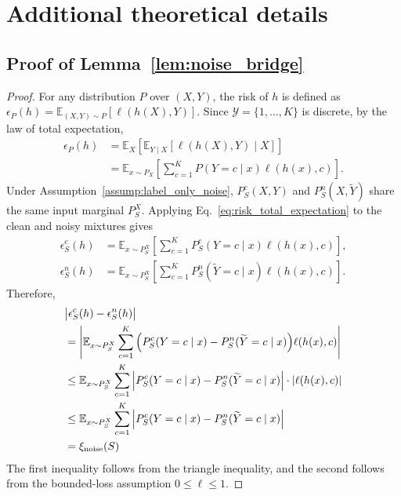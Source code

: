 \documentclass[conference]{IEEEtran}
\theoremstyle{definition}
\theoremstyle{remark}
\begin{document}
\section{Additional theoretical details}
\label{app:theory_appendix}
\subsection{Proof of Lemma~\ref{lem:noise_bridge}}
\begin{proof}
For any distribution $P$ over $(X,Y)$, the risk of $h$ is defined as
$\epsilon_P(h)=\mathbb E_{(X,Y)\sim P}[\ell(h(X),Y)]$.
Since $\mathcal Y=\{1,\dots,K\}$ is discrete, by the law of total expectation,
\begin{align}
\epsilon_P(h)
&=
\mathbb E_{X}
\left[
\mathbb E_{Y\mid X}
\left[
\ell(h(X),Y)
\mid X
\right]
\right] \\
&=
\mathbb E_{x\sim P_X}
\left[
\sum_{c=1}^{K}
P(Y=c\mid x)\ell(h(x),c)
\right].
\label{eq:risk_total_expectation}
\end{align}
Under Assumption~\ref{assump:label_only_noise}, $P_S^c(X,Y)$ and $P_S^n(X,\widetilde Y)$ share the same input marginal $P_S^X$.
Applying Eq.~\eqref{eq:risk_total_expectation} to the clean and noisy mixtures gives
\begin{align}
\epsilon_S^c(h)
&=
\mathbb{E}_{x\sim P_S^X}
\left[
\sum_{c=1}^{K}
P_S^c(Y=c\mid x)
\ell(h(x),c)
\right],\\
\epsilon_S^n(h)
&=
\mathbb{E}_{x\sim P_S^X}
\left[
\sum_{c=1}^{K}
P_S^n(\widetilde Y=c\mid x)
\ell(h(x),c)
\right].
\end{align}
Therefore,
\begin{align}
&\big|\epsilon_S^c(h)-\epsilon_S^n(h)\big|\\
&= \Bigg|
\mathbb{E}_{x\sim P_S^X} \sum_{c=1}^{K} 
\Big( P_S^c(Y=c\mid x) - P_S^n(\widetilde Y=c\mid x) \Big)
\ell(h(x),c)
\Bigg| \notag \\
&\le \mathbb{E}_{x\sim P_S^X} 
\sum_{c=1}^{K} 
\Big| P_S^c(Y=c\mid x) - P_S^n(\widetilde Y=c\mid x) \Big|
\cdot |\ell(h(x),c)| \notag \\
&\le \mathbb{E}_{x\sim P_S^X} 
\sum_{c=1}^{K} 
\Big| P_S^c(Y=c\mid x) - P_S^n(\widetilde Y=c\mid x) \Big| \notag \\
&= \xi_{\mathrm{noise}}(S)
\end{align}
The first inequality follows from the triangle inequality, and the second follows from the bounded-loss assumption $0\le \ell\le 1$.
\end{proof}
\end{document}
